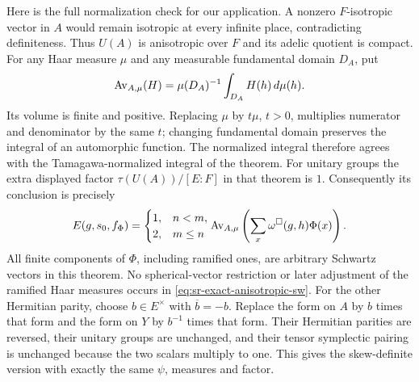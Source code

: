 Here is the full normalization check for our application.
A nonzero \(F\)-isotropic vector in \(A\) would remain
isotropic at every infinite place, contradicting definiteness.
Thus \(U(A)\) is anisotropic over \(F\) and its adelic
quotient is compact.
For any Haar measure \(\mu\) and any measurable fundamental
domain \(D_A\), put
\[
       {\rm Av}_{A,\mu}(H)
           =\mu(D_A)^{-1}\int_{D_A}H(h)\,d\mu(h).
\]
Its volume is finite and positive.
Replacing \(\mu\) by \(t\mu\), \(t>0\), multiplies numerator
and denominator by the same \(t\); changing fundamental
domain preserves the integral of an automorphic function.
The normalized integral therefore agrees with the
Tamagawa-normalized integral of the theorem.
For unitary groups the extra displayed factor
\(\tau(U(A))/[E:F]\) in that theorem is \(1\).
Consequently its conclusion is precisely
\begin{equation}\label{eq:sr-exact-anisotropic-sw}
 E(g,s_0,f_{\Phi})
       =\begin{cases}1,&n<m,\\2,&m\le n\end{cases}
          {\rm Av}_{A,\mu}
            \left(\sum_{x}
                  \omega^\square(g,h)\Phi(x)\right).
\end{equation}
All finite components of \(\Phi\), including ramified ones,
are arbitrary Schwartz vectors in this theorem.
No spherical-vector restriction or later adjustment of the
ramified Haar measures occurs in
\eqref{eq:sr-exact-anisotropic-sw}.
For the other Hermitian parity, choose
\(b\in E^\times\) with \(\overline b=-b\).
Replace the form on \(A\) by \(b\) times that form and the
form on \(Y\) by \(b^{-1}\) times that form.
Their Hermitian parities are reversed, their unitary groups
are unchanged, and their tensor symplectic pairing is
unchanged because the two scalars multiply to one.
This gives the skew-definite version with exactly the same
\(\psi\), measures and factor.


